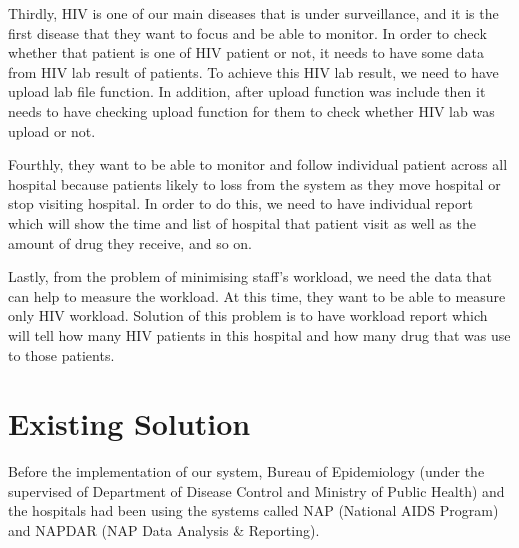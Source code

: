     Thirdly, HIV is one of our main diseases that is under surveillance, and it is the first disease that they want to focus and be able to monitor. In order to check whether that patient is one of HIV patient or not, it needs to have some data from HIV lab result of patients. To achieve this HIV lab result, we need to have upload lab file function. In addition, after upload function was include then it needs to have checking upload function for them to check whether HIV lab was upload or not.
    
    Fourthly, they want to be able to monitor and follow individual patient across all hospital because patients likely to loss from the system as they move hospital or stop visiting hospital. In order to do this, we need to have individual report which will show the time and list of hospital that patient visit as well as the amount of drug they receive, and so on.
    
    Lastly, from the problem of minimising staff's workload, we need the data that can help to measure the workload. At this time, they want to be able to measure only HIV workload. Solution of this problem is to have workload report which will tell how many HIV patients in this hospital and how many drug that was use to those patients.
    

\section{Existing Solution}
    
    Before the implementation of our system, Bureau of Epidemiology (under the supervised of Department of Disease Control and Ministry of Public Health) and the hospitals had been using the systems called NAP (National AIDS Program)\cite{nap} and NAPDAR (NAP Data Analysis \& Reporting).
    
